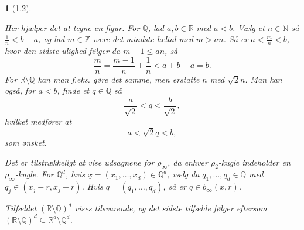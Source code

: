 \documentclass[a4paper, 11pt, article, danish, oneside]{memoir}
\newcommand{\naturals}{\mathbb{N}}
\newcommand{\ints}{\mathbb{Z}}
\newcommand{\rationals}{\mathbb{Q}}
\newcommand{\reals}{\mathbb{R}}
\newcommand{\pencilsymbol}{\raisebox{-2pt}{\normalfont\PencilLeft}}
\theoremstyle{changedotcustomnumber}
\theoremstyle{changedotbreakcustomnumber}
\newtheorem{opgavebreak}{\pencilsymbol}
\begin{document}
\begin{opgavebreak}[1.2]
\begin{solutionsec}
    \item Her hjælper det at tegne en figur. For $\rationals$, lad $a,b \in \reals$ med $a < b$. Vælg et $n \in \naturals$ så $\frac{1}{n} < b-a$, og lad $m \in \ints$ være det mindste heltal med $m > an$. Så er $a < \frac{m}{n} < b$, hvor den sidste ulighed følger da $m-1 \leq an$, så
    \begin{equation*}
        \frac{m}{n}
            = \frac{m-1}{n} + \frac{1}{n}
            < a + b - a
            = b.
    \end{equation*}
    For $\reals \setminus \rationals$ kan man f.eks. gøre det samme, men erstatte $n$ med $\sqrt{2}n$. Man kan også, for $a < b$, finde et $q \in \rationals$ så
    \begin{equation*}
        \frac{a}{\sqrt{2}}
            < q
            < \frac{b}{\sqrt{2}},
    \end{equation*}
    hvilket medfører at
    \begin{equation*}
        a
            < \sqrt{2}q
            < b,
    \end{equation*}
    som ønsket.

    \item Det er tilstrækkeligt at vise udsagnene for $\rho_\infty$, da enhver $\rho_2$-kugle indeholder en $\rho_\infty$-kugle. For $\rationals^d$, hvis $\underline{x} = (x_1, \ldots, x_d) \in \rationals^d$, vælg da $q_1, \ldots, q_d \in \rationals$ med $q_j \in (x_j - r, x_j + r)$. Hvis $\underline{q} = (q_1, \ldots, q_d)$, så er $\underline{q} \in b_\infty(\underline{x},r)$.

    Tilfældet $(\reals \setminus \rationals)^d$ vises tilsvarende, og det sidste tilfælde følger eftersom $(\reals \setminus \rationals)^d \subseteq \reals^d \setminus \rationals^d$.
\end{solutionsec}
\end{opgavebreak}
\end{document}
